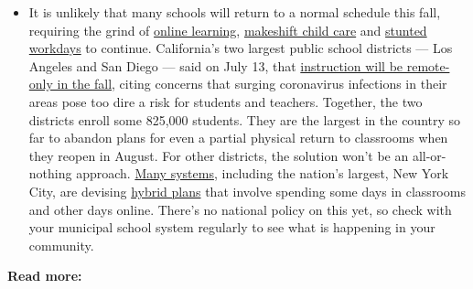 \begin{itemize}
  \begin{itemize}
  \tightlist
  \item
    It is unlikely that many schools will return to a normal schedule
    this fall, requiring the grind of
    \href{https://www.nytimes.com/2020/06/05/us/coronavirus-education-lost-learning.html?action=click\&pgtype=Article\&state=default\&region=MAIN_CONTENT_3\&context=storylines_faq}{online
    learning},
    \href{https://www.nytimes.com/2020/05/29/us/coronavirus-child-care-centers.html?action=click\&pgtype=Article\&state=default\&region=MAIN_CONTENT_3\&context=storylines_faq}{makeshift
    child care} and
    \href{https://www.nytimes.com/2020/06/03/business/economy/coronavirus-working-women.html?action=click\&pgtype=Article\&state=default\&region=MAIN_CONTENT_3\&context=storylines_faq}{stunted
    workdays} to continue. California's two largest public school
    districts --- Los Angeles and San Diego --- said on July 13, that
    \href{https://www.nytimes.com/2020/07/13/us/lausd-san-diego-school-reopening.html?action=click\&pgtype=Article\&state=default\&region=MAIN_CONTENT_3\&context=storylines_faq}{instruction
    will be remote-only in the fall}, citing concerns that surging
    coronavirus infections in their areas pose too dire a risk for
    students and teachers. Together, the two districts enroll some
    825,000 students. They are the largest in the country so far to
    abandon plans for even a partial physical return to classrooms when
    they reopen in August. For other districts, the solution won't be an
    all-or-nothing approach.
    \href{https://bioethics.jhu.edu/research-and-outreach/projects/eschool-initiative/school-policy-tracker/}{Many
    systems}, including the nation's largest, New York City, are
    devising
    \href{https://www.nytimes.com/2020/06/26/us/coronavirus-schools-reopen-fall.html?action=click\&pgtype=Article\&state=default\&region=MAIN_CONTENT_3\&context=storylines_faq}{hybrid
    plans} that involve spending some days in classrooms and other days
    online. There's no national policy on this yet, so check with your
    municipal school system regularly to see what is happening in your
    community.
  \end{itemize}
\end{itemize}

\textbf{Read more:}

